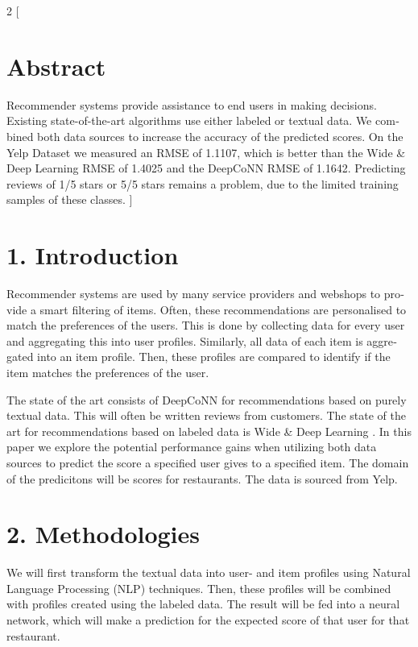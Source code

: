 \begin{otherlanguage}{english}
\begin{multicols}{2}
[
\section*{\centering Abstract}
Recommender systems provide assistance to end users in making decisions. Existing state-of-the-art algorithms use either labeled or textual data. We combined both data sources to increase the accuracy of the predicted scores. On the Yelp Dataset we measured an RMSE of 1.1107, which is better than the Wide \& Deep Learning RMSE of 1.4025 and the DeepCoNN RMSE of 1.1642. Predicting reviews of 1/5 stars or 5/5 stars remains a problem, due to the limited training samples of these classes. 
]

\section*{1. Introduction}
Recommender systems are used by many service providers and webshops to provide a smart filtering of items. Often, these recommendations are personalised to match the preferences of the users. This is done by collecting data for every user and aggregating this into user profiles. Similarly, all data of each item is aggregated into an item profile. Then, these profiles are compared to identify if the item matches the preferences of the user.

The state of the art consists of DeepCoNN \cite{deepconn_eng_summary} for recommendations based on purely textual data. This will often be written reviews from customers. The state of the art for recommendations based on labeled data is Wide \& Deep Learning \cite{wide_deep_learning_paper_eng_summary}.\newline
In this paper we explore the potential performance gains when utilizing both data sources to predict the score a specified user gives to a specified item. The domain of the predicitons will be scores for restaurants. The data is sourced from Yelp. \cite{Yelp_Dataset_eng_summary}

\section*{2. Methodologies}
We will first transform the textual data into user- and item profiles using Natural Language Processing (NLP) techniques. Then, these profiles will be combined with profiles created using the labeled data. The result will be fed into a neural network, which will make a prediction for the expected score of that user for that restaurant.


\end{multicols}
\end{otherlanguage}
